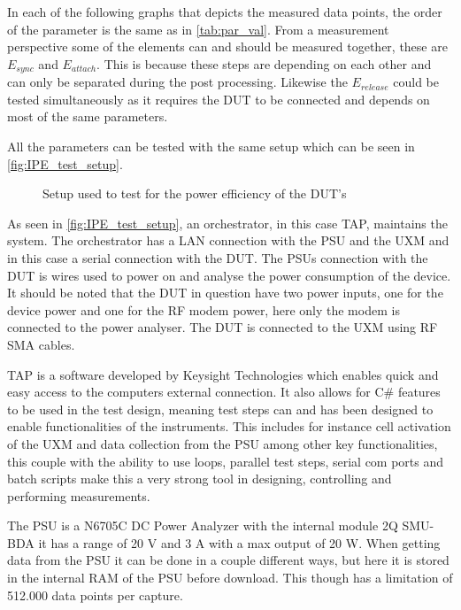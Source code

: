 In each of the following graphs that depicts the measured data points, the order of the parameter is the same as in \autoref{tab:par_val}. From a measurement perspective some of the elements can and should be measured together, these are $E_{sync}$ and $E_{attach}$. This is because these steps are depending on each other and can only be separated during the  post processing. Likewise the $E_{release}$ could be tested simultaneously as it requires the DUT to be connected and depends on most of the same parameters.  




All the parameters can be tested with the same setup which can be seen in \autoref{fig:IPE_test_setup}.

\begin{figure}[H]
\centering

\caption{Setup used to test for the power efficiency of the \gls{DUT}'s}
\label{fig:IPE_test_setup}
\end{figure}


As seen in \autoref{fig:IPE_test_setup}, an orchestrator, in this case \gls{TAP}, maintains the system. The orchestrator has a \gls{LAN} connection with the \gls{PSU} and the UXM and in this case a serial connection with the DUT. The \gls{PSU}s connection with the DUT is wires used to power on and analyse the power consumption of the device. It should be noted that the \gls{DUT} in question have two power inputs, one for the device power and one for the RF modem power, here only the modem is connected to the power analyser. The DUT is connected to the UXM using RF SMA cables.

\gls{TAP} is a software developed by Keysight Technologies which enables quick and easy access to the computers external connection. It also allows for C\# features to be used in the test design, meaning test steps can and has been designed to enable functionalities of the instruments. This includes for instance cell activation of the UXM and data collection from the PSU among other key functionalities, this couple with the ability to use loops, parallel test steps, serial com ports and batch scripts make this a very strong tool in designing, controlling and performing measurements. \citep{TAP} 

The \gls{PSU} is a N6705C DC Power Analyzer with the internal module 2Q SMU-BDA it has a range of 20 V and 3 A with a max output of 20 W. When getting data from the PSU it can be done in a couple different ways, but here it is stored in the internal RAM of the PSU before download. This though has a limitation of 512.000 data points per capture. \citep{PSU}

